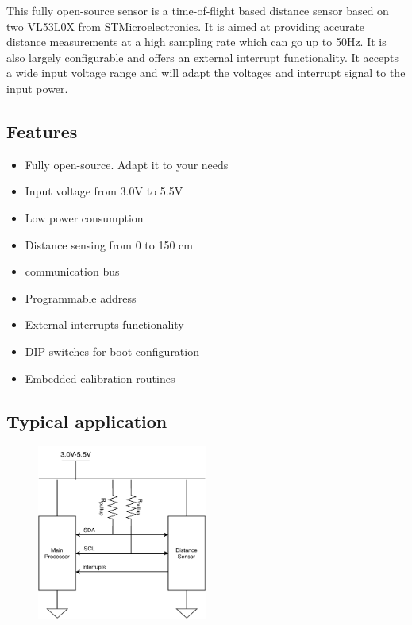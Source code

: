 \begin{multicols}{2}
 This fully open-source sensor is a time-of-flight based distance sensor based on two VL53L0X from STMicroelectronics. It is aimed at providing accurate distance measurements at a high sampling rate which can go up to 50Hz. It is also largely configurable and offers an external interrupt functionality. It accepts a wide input voltage range and will adapt the \iic voltages and interrupt signal to the input power.
 \columnbreak
 \subsection{Features}
 \begin{itemize}
  \item Fully open-source. Adapt it to your needs
  \item Input voltage from 3.0V to 5.5V
  \item Low power consumption
  \item Distance sensing from 0 to 150 cm
  \item \iic communication bus
  \item Programmable \iic address
  \item External interrupts functionality
  \item DIP switches for boot configuration
  \item Embedded calibration routines
 \end{itemize}
\end{multicols}

\subsection{Typical application}

\begin{figure}[h]
 \centering
 \includegraphics[width=0.5\textwidth]{../img/dual-vl53l0x-sensor.pdf}
\end{figure}